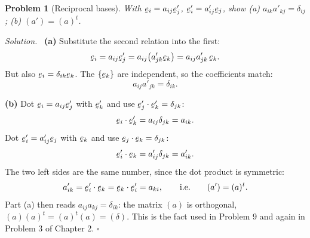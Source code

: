 \documentclass[17pt,a4paper]{extreport}
\DeclareRobustCommand{\vek}[1]{\underaccent{\tilde}{#1}}
\newcommand{\be}{\vek{e}}
\newcommand{\dd}{\delta}
\newcommand{\ip}[2]{#1\cdot#2}
\theoremstyle{scplain}
\theoremstyle{scdefn}
\theoremstyle{scplain}
\newtheorem{problem}{Problem}
\newenvironment{solution}
 {\par\smallskip\noindent\textit{Solution.}\ }
 {\hfill$\square$\par\medskip}
\begin{document}
\begin{problem}[Reciprocal bases]
With $\be_i=a_{ij}\be'_j$, $\be'_i=a'_{ij}\be_j$, show (a)
$a_{ik}a'_{kj}=\dd_{ij}$; (b) $(a')=(a)^{t}$.
\end{problem}
\begin{solution}
\textbf{(a)} Substitute the second relation into the first:
\[
   \be_i=a_{ij}\be'_j=a_{ij}\big(a'_{jk}\be_k\big)=a_{ij}a'_{jk}\,\be_k .
\]
But also $\be_i=\dd_{ik}\be_k$. The $\{\be_k\}$ are independent, so the
coefficients match:
\[
   a_{ij}a'_{jk}=\dd_{ik}.
\]

\textbf{(b)} Dot $\be_i=a_{ij}\be'_j$ with $\be'_k$ and use
$\ip{\be'_j}{\be'_k}=\dd_{jk}$:
\[
   \ip{\be_i}{\be'_k}=a_{ij}\dd_{jk}=a_{ik}.
\]
Dot $\be'_i=a'_{ij}\be_j$ with $\be_k$ and use $\ip{\be_j}{\be_k}=\dd_{jk}$:
\[
   \ip{\be'_i}{\be_k}=a'_{ij}\dd_{jk}=a'_{ik}.
\]
The two left sides are the same number, since the dot product is
symmetric:
\[
   a'_{ik}=\ip{\be'_i}{\be_k}=\ip{\be_k}{\be'_i}=a_{ki},
   \qquad\text{i.e.}\qquad (a')=(a)^{t}.
\]
Part (a) then reads $a_{ij}a_{kj}=\dd_{ik}$: the matrix $(a)$ is
orthogonal, $(a)(a)^{t}=(a)^{t}(a)=(\dd)$. This is the fact used in
Problem 9 and again in Problem 3 of Chapter 2.
\end{solution}
\end{document}
